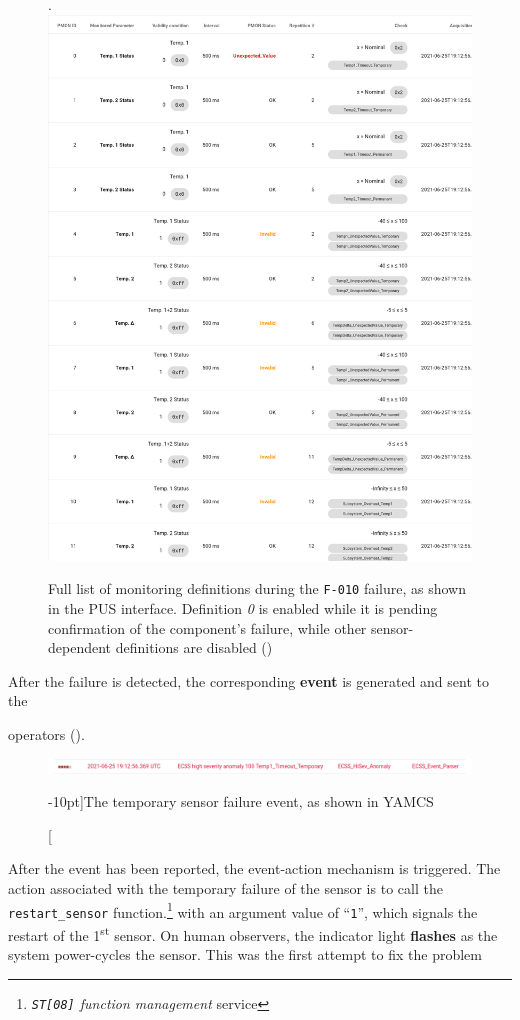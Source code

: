 \documentclass[a4paper,nobib]{tufte-book}
\begin{document}
\begin{figure}
\centering
\caption[Full list of monitoring definitions during the \texttt{F-010} failure]{Full list of monitoring definitions during the \texttt{F-010} failure, as shown in the \acs{PUS} interface. Definition \emph{0} is enabled while it is pending confirmation of the component's failure, while other sensor-dependent definitions are disabled (\invalid)}.
\label{fig:pusf010moni}
\includegraphics[width=.8\textwidth]{media/screenshots/pus_f010_moni}
\end{figure}

After the failure is detected, the corresponding \textbf{event} is generated and sent to the{operators ().
		
\begin{figure}
\centering
\includegraphics{media/screenshots/yamcs_f010_event}
\caption[][-10pt]{The temporary sensor failure event, as shown in \acs{YAMCS}}
\label{fig:yamcsf010event}
\end{figure}

After the event has been reported, the event-action mechanism is triggered. The action associated with the temporary failure of the sensor is to call the \texttt{restart\_sensor} function.\footnote{\emph{\texttt{ST[08]} function management} service} with an argument value of ``\texttt{1}'', which signals the restart of the 1\textsuperscript{st} sensor. On human observers, the indicator light \textbf{flashes} as the system power-cycles the sensor. This was the first attempt to fix the problem}
	
\end{document}
